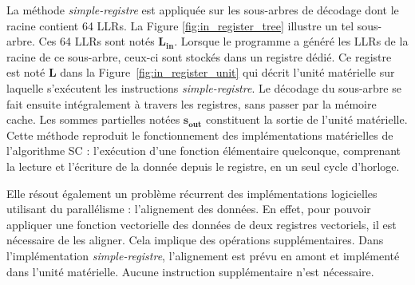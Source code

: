 La méthode \textit{simple-registre} est appliquée sur les sous-arbres de décodage dont le \noeud racine contient 64 LLRs. La Figure \ref{fig:in_register_tree} illustre un tel sous-arbre.
Ces 64 LLRs sont notés $\mathbold{L_{in}}$.
Lorsque le programme a généré les LLRs de la racine de ce sous-arbre, ceux-ci sont stockés dans un registre dédié.
Ce registre est noté $\mathbold{L}$ dans la Figure~\ref{fig:in_register_unit} qui décrit l'unité matérielle sur laquelle s'exécutent les instructions \textit{simple-registre}.
Le décodage du sous-arbre se fait ensuite intégralement à travers les registres, sans passer par la mémoire cache.
Les sommes partielles notées $\mathbold{s_{out}}$ constituent la sortie de l'unité matérielle.
Cette méthode reproduit le fonctionnement des implémentations matérielles de l'algorithme SC : l'exécution d'une fonction élémentaire quelconque, comprenant la lecture et l'écriture de la donnée depuis le registre, en un seul cycle d'horloge.





Elle résout également un problème récurrent des implémentations logicielles utilisant du parallélisme : l'alignement des données. En effet, pour pouvoir appliquer une fonction vectorielle des données de deux registres vectoriels, il est nécessaire de les aligner. Cela implique des opérations supplémentaires. Dans l'implémentation \textit{simple-registre}, l'alignement est prévu en amont et implémenté dans l'unité matérielle. Aucune instruction supplémentaire n'est nécessaire. 

